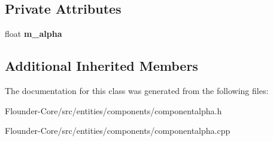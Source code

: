 \subsection*{Private Attributes}
\begin{DoxyCompactItemize}
\item 
\mbox{\label{classflounder_1_1componentalpha_a8d2368973e8284337e85af6f01c13e06}} 
float {\bfseries m\+\_\+alpha}
\end{DoxyCompactItemize}
\subsection*{Additional Inherited Members}


The documentation for this class was generated from the following files\+:\begin{DoxyCompactItemize}
\item 
Flounder-\/\+Core/src/entities/components/componentalpha.\+h\item 
Flounder-\/\+Core/src/entities/components/componentalpha.\+cpp\end{DoxyCompactItemize}
